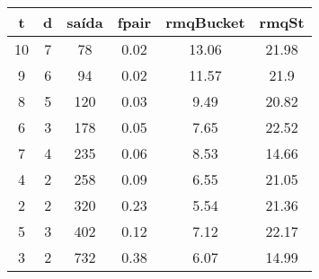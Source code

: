 \begin{tabular}{|c|c|c|c|c|c|}
\hline
\textbf{t} & \textbf{d} & \textbf{saída} & \textbf{fpair} & \textbf{rmqBucket} & \textbf{rmqSt}\\
\hline
10 & 7 & 78 & 0.02 & 13.06 & 21.98\\
\hline
9 & 6 & 94 & 0.02 & 11.57 & 21.9\\
\hline
8 & 5 & 120 & 0.03 & 9.49 & 20.82\\
\hline
6 & 3 & 178 & 0.05 & 7.65 & 22.52\\
\hline
7 & 4 & 235 & 0.06 & 8.53 & 14.66\\
\hline
4 & 2 & 258 & 0.09 & 6.55 & 21.05\\
\hline
2 & 2 & 320 & 0.23 & 5.54 & 21.36\\
\hline
5 & 3 & 402 & 0.12 & 7.12 & 22.17\\
\hline
3 & 2 & 732 & 0.38 & 6.07 & 14.99\\
\hline
\end{tabular}
